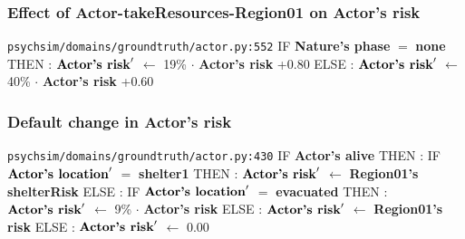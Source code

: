 \documentclass{article}%
\begin{document}
\subsubsection{Effect of Actor{-}takeResources{-}Region01 on Actor's risk}%
\label{ssubsec:Effect of Actor{-}takeResources{-}Region01 on Actor's risk}%
\begin{flushleft}%
\verb|psychsim/domains/groundtruth/actor.py:552|%
\linebreak%
IF %
\textbf{Nature's phase}%
$=$%
\textbf{none}%
\linebreak%
\hspace*{2em}%
THEN %
: %
$\mbox{\textbf{Actor's risk}} '$%
$\leftarrow$%
19\%%
$\cdot$%
\textbf{Actor's risk}%
+0.80%
\linebreak%
\hspace*{2em}%
ELSE %
: %
$\mbox{\textbf{Actor's risk}} '$%
$\leftarrow$%
40\%%
$\cdot$%
\textbf{Actor's risk}%
+0.60%
\end{flushleft}

%
\subsubsection{Default change in Actor's risk}%
\label{ssubsec:Default change in Actor's risk}%
\begin{flushleft}%
\verb|psychsim/domains/groundtruth/actor.py:430|%
\linebreak%
IF %
\textbf{Actor's alive}%
\linebreak%
\hspace*{2em}%
THEN %
: %
IF %
$\mbox{\textbf{Actor's location}} '$%
$=$%
\textbf{shelter1}%
\linebreak%
\hspace*{4em}%
THEN %
: %
$\mbox{\textbf{Actor's risk}} '$%
$\leftarrow$%
\textbf{Region01's shelterRisk}%
\linebreak%
\hspace*{4em}%
ELSE %
: %
IF %
$\mbox{\textbf{Actor's location}} '$%
$=$%
\textbf{evacuated}%
\linebreak%
\hspace*{6em}%
THEN %
: %
$\mbox{\textbf{Actor's risk}} '$%
$\leftarrow$%
9\%%
$\cdot$%
\textbf{Actor's risk}%
\linebreak%
\hspace*{6em}%
ELSE %
: %
$\mbox{\textbf{Actor's risk}} '$%
$\leftarrow$%
\textbf{Region01's risk}%
\linebreak%
\hspace*{2em}%
ELSE %
: %
$\mbox{\textbf{Actor's risk}} '$%
$\leftarrow$%
0.00%
\end{flushleft}
\end{document}
